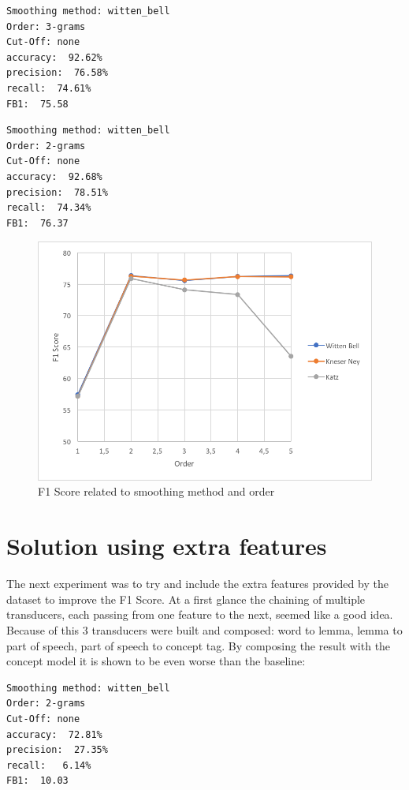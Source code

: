 \documentclass[11pt,a4paper]{article}
\begin{document}
\begin{verbatim}
Smoothing method: witten_bell
Order: 3-grams
Cut-Off: none
accuracy:  92.62%
precision:  76.58%
recall:  74.61%
FB1:  75.58
\end{verbatim}

\begin{verbatim}
Smoothing method: witten_bell
Order: 2-grams
Cut-Off: none
accuracy:  92.68%
precision:  78.51%
recall:  74.34%
FB1:  76.37
\end{verbatim}

\begin{figure}[h]
\centering
  \includegraphics[width=.9\linewidth]{Images/f1score}
  \caption{F1 Score related to smoothing method and order}
\label{fig:zipf}
\end{figure}

\section{Solution using extra features}

The next experiment was to try and include the extra features provided by the dataset to improve the F1 Score.
At a first glance the chaining of multiple transducers, each passing from one feature to the next, seemed like a good idea.
Because of this 3 transducers were built and composed: word to lemma, lemma to part of speech, part of speech to concept tag.
By composing the result with the concept model it is shown to be even worse than the baseline:

\begin{verbatim}
Smoothing method: witten_bell
Order: 2-grams
Cut-Off: none
accuracy:  72.81%
precision:  27.35%
recall:   6.14%
FB1:  10.03
\end{verbatim}
\end{document}

